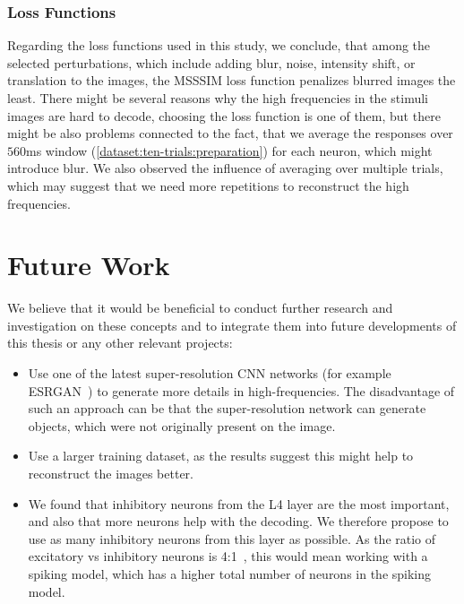 \subsubsection{Loss Functions}

Regarding the loss functions used in this study, we conclude, that among the selected perturbations, which include adding blur, noise, intensity shift, or translation to the images, the MSSSIM loss function penalizes blurred images the least.
There might be several reasons why the high frequencies in the stimuli images are hard to decode, choosing the loss function is one of them, but there might be also problems connected to the fact, that we average the responses over $560$ms window (\ref{dataset:ten-trials:preparation}) for each neuron, which might introduce blur. We also observed the influence of averaging over multiple trials, which may suggest that we need more repetitions to reconstruct the high frequencies.



\section*{Future Work}
We believe that it would be beneficial to conduct further research and investigation on these concepts and to integrate them into future developments of this thesis or any other relevant projects:

\begin{itemize}
\item Use one of the latest super-resolution CNN networks (for example ESRGAN~\citep{wang2018esrgan}) to generate more details in high-frequencies. The disadvantage of such an approach can be that the super-resolution network can generate objects, which were not originally present on the image.

\item Use a larger training dataset, as the results suggest this might help to reconstruct the images better.

\item We found that inhibitory neurons from the L4 layer are the most important, and also that more neurons help with the decoding. We therefore propose to use as many inhibitory neurons from this layer as possible. As the ratio of excitatory vs inhibitory neurons is 4:1~\citep{Li_2018}, this would mean working with a spiking model, which has a higher total number of neurons in the spiking model.

\end{itemize}
